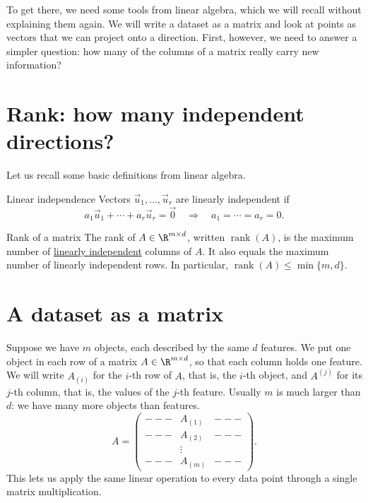 \documentclass[a4paper,12pt,oneside]{report}
\begin{document}
To get there, we need some tools from linear algebra, which we will
recall without explaining them again. We will write a
dataset as a matrix and look at points as vectors that we can project
onto a direction. First, however, we need to answer a simpler
question: how many of the columns of a matrix really carry new
information?

\section{Rank: how many independent directions?}

Let us recall some basic definitions from linear algebra.

\begin{frameddefn}{Linear independence}
\label{def:linear-independence}
Vectors $\vec u_1,\ldots,\vec u_r$ are linearly independent if
\[
  a_1\vec u_1+\cdots+a_r\vec u_r=\vec0
  \quad\Longrightarrow\quad a_1=\cdots=a_r=0.
\]
\end{frameddefn}

\begin{frameddefn}{Rank of a matrix}
\label{def:matrix-rank}
The rank of $A\in\R^{m\times d}$, written $\operatorname{rank}(A)$,
is the maximum number of
\hyperref[def:linear-independence]{linearly independent} columns of
$A$. It also equals the maximum number of linearly independent rows.
In particular, $\operatorname{rank}(A)\leq\min\{m,d\}$.
\end{frameddefn}

\section{A dataset as a matrix}
\label{sec:data-matrix}

Suppose we have $m$ objects, each described by the same $d$
features. We put one object in each row of a matrix
$A\in\R^{m\times d}$, so that each column holds one feature. We will
write $A_{(i)}$ for the $i$-th row of $A$, that is, the $i$-th
object, and $A^{(j)}$ for its $j$-th column, that is, the values of
the $j$-th feature. Usually $m$ is much larger than $d$: we have many
more objects than features.
\[
  A=\begin{pmatrix}---&A_{(1)}&---\\
                   ---&A_{(2)}&---\\
                   &\vdots&\\
                   ---&A_{(m)}&---\end{pmatrix}.
\]
This lets us apply the same linear operation to every data point
through a single matrix multiplication.
\end{document}
